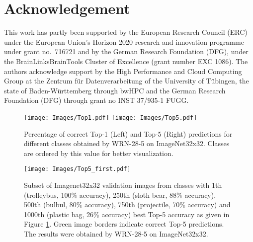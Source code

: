 \documentclass{article} \usepackage{iclr2017_conference,times}
\begin{document}
\section{Acknowledgement}
This work has partly been supported by the European Research Council (ERC) under the European Union’s Horizon 2020 research and innovation programme under grant no.\ 716721 and by the German Research Foundation (DFG), under the BrainLinksBrainTools Cluster of Excellence (grant number EXC 1086).
The authors acknowledge support by the High Performance and Cloud Computing Group at the Zentrum f\"{u}r Datenverarbeitung of the University of T\"{u}bingen, the state of Baden-W\"{u}rttemberg through bwHPC
and the German Research Foundation (DFG) through grant no INST 37/935-1 FUGG. 



\begin{figure}[tbp]
\begin{center}
\texttt{[image: Images/Top1.pdf]}
\texttt{[image: Images/Top5.pdf]}
\end{center}
\caption{Percentage of correct Top-1 (Left) and Top-5 (Right) predictions for different classes obtained by WRN-28-5 on ImageNet32x32. Classes are ordered by this value for better visualization.}
\label{FigureOrd}
\end{figure}




\renewcommand\refname{Bibliography}





\begin{figure}[tb]
\begin{center}
\texttt{[image: Images/Top5\_first.pdf]}
\end{center}
 \caption{Subset of Imagenet32x32 validation images from classes with 1th (trolleybus, 100\% accuracy), 250th (sloth bear, 88\% accuracy), 500th (bulbul, 80\% accuracy), 750th (projectile, 70\% accuracy) and 1000th (plastic bag, 26\% accuracy) best Top-5 accuracy as given in Figure \ref{FigureOrd}. Green image borders indicate correct Top-5 predictions. The results were obtained by WRN-28-5 on ImageNet32x32.}
\label{FigureOrdExamples}
\end{figure}
\end{document}
